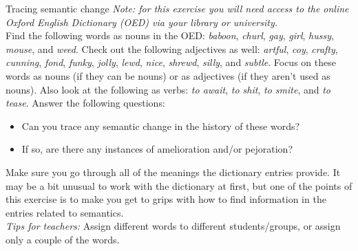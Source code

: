 
\begin{exercises}{Tracing semantic change}\label{exercise-semchange}
\emph{Note: for this exercise you will need access to the online Oxford English Dictionary (OED) via your library or university.}\\

\noindent Find the following words as nouns in the OED: \textit{baboon}, \textit{churl}, \textit{gay}, \textit{girl}, \textit{hussy}, \textit{mouse}, and \textit{weed}. Check out the following adjectives as well: \textit{artful}, \textit{coy}, \textit{crafty}, \textit{cunning}, \textit{fond}, \textit{funky}, \textit{jolly}, \textit{lewd}, \textit{nice}, \textit{shrewd}, \textit{silly}, and \textit{subtle}. Focus on these words as nouns (if they can be nouns) or as adjectives (if they aren't used as nouns). Also look at the following as verbs: \textit{to await}, \textit{to shit}, \textit{to smite}, and \textit{to tease}. Answer the following questions:


\begin{itemize}
\item Can you trace any semantic change in the history of these words?
\item If so, are there any instances of amelioration and/or pejoration?
\end{itemize}
Make sure you go through all of the meanings the dictionary entries provide. It may be a bit unusual to work with the dictionary at first, but one of the points of this exercise is to make you get to grips with how to find information in the entries related to semantics.\\

\noindent \emph{Tips for teachers:} Assign different words to different students/groups, or assign only a couple of the words.
\end{exercises}

